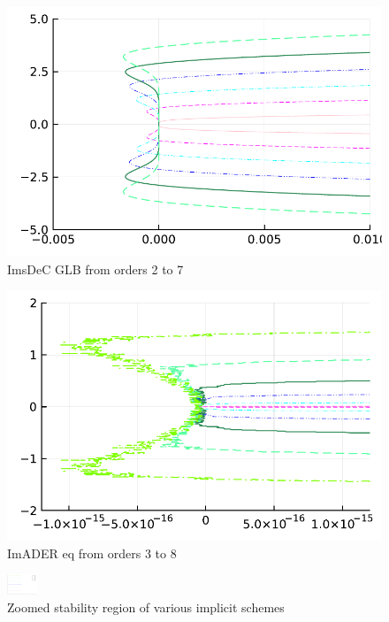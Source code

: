 \begin{figure}
\begin{minipage}[t]{0.45\textwidth}
		\includegraphics[width=\textwidth]{pdf/odepics/IMEXDeC_subtimesteps_gaussLobatto_zoom.pdf}
		\centering
		ImsDeC GLB from orders 2 to 7
	\end{minipage}
	\begin{minipage}[t]{0.45\textwidth}
		\includegraphics[width=\textwidth]{pdf/odepics/IMEXADER_equispaced_zoom.pdf}
		\centering
		ImADER eq from orders 3 to 8
	\end{minipage}
	\includegraphics[width=0.08\textwidth, trim={491 180 30 23}, clip]{pdf/odepics/colors_a-d_new_2-8_no_order.pdf}
	\caption{Zoomed stability region of various implicit schemes}
	\label{fig: ODE_minor_instabilitys}
\end{figure}

